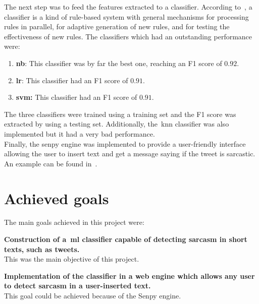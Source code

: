 The next step was to feed the features extracted to a classifier. According to~\cite{clasif}, a classifier is a kind of rule-based system with general mechanisms for processing rules in parallel, for adaptive generation of new rules, and for testing the effectiveness of new rules. The classifiers which had an outstanding performance were:
\begin{enumerate}
	\item \textbf{\acl{nb}}: This classifier was by far the best one, reaching an F1 score of $0.92$.
	\item \textbf{\acl{lr}}: This classifier had an F1 score of $0.91$.
	\item \textbf{\acl{svm}:} This classifier had an F1 score of $0.91$.
\end{enumerate} 
The three classifiers were trained using a training set and the F1 score was extracted by using a testing set.
Additionally, the~\acl{knn} classifier was also implemented but it had a very bad performance.\\
Finally, the senpy engine was implemented to provide a user-friendly interface allowing the user to insert text and get a message saying if the tweet is sarcastic. An example can be found in~.

\section{Achieved goals}
The main goals achieved in this project were:
\begin{description}
	\item \textbf{Construction of a~\ac{ml} classifier capable of detecting sarcasm in short texts, such as tweets.}\\
	This was the main objective of this project.
	\item \textbf{Implementation of the classifier in a web engine which allows any user to detect sarcasm in a user-inserted text.}\\
	This goal could be achieved because of the Senpy engine.
	
\end{description}

